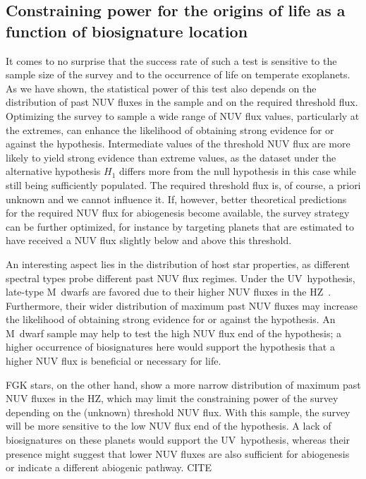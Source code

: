 \documentclass[twocolumn,twocolappendix,linenumbers]{aastex631}
\begin{document}
\subsection{Constraining power for the origins of life as a function of biosignature location} %
It comes to no surprise that the success rate of such a test is sensitive to the sample size of the survey and to the occurrence of life on temperate exoplanets.
As we have shown, the statistical power of this test also depends on the distribution of past \gls{NUV} fluxes in the sample and on the required threshold flux.
Optimizing the survey to sample a wide range of NUV flux values, particularly at the extremes, can enhance the likelihood of obtaining strong evidence for or against the hypothesis.
Intermediate values of the threshold \gls{NUV} flux are more likely to yield strong evidence than extreme values, as the dataset under the alternative hypothesis $H_1$ differs more from the null hypothesis in this case while still being sufficiently populated.
The required threshold flux is, of course, a priori unknown and we cannot influence it.
If, however, better theoretical predictions for the required \gls{NUV} flux for abiogenesis become available, the survey strategy can be further optimized, for instance by targeting planets that are estimated to have received a \gls{NUV} flux slightly below and above this threshold.

An interesting aspect lies in the distribution of host star properties, as different spectral types probe different past \gls{NUV} flux regimes.
Under the UV~hypothesis, late-type M~dwarfs are favored due to their higher \gls{NUV} fluxes in the \gls{HZ}~\citep{Richey-Yowell2023}.
Furthermore, their wider distribution of maximum past \gls{NUV} fluxes may increase the likelihood of obtaining strong evidence for or against the hypothesis.
An M~dwarf sample may help to test the high \gls{NUV} flux end of the hypothesis; a higher occurrence of biosignatures here would support the hypothesis that a higher NUV flux is beneficial or necessary for life.

FGK stars, on the other hand, show a more narrow distribution of maximum past \gls{NUV} fluxes in the \gls{HZ}, which may limit the constraining power of the survey depending on the (unknown) threshold \gls{NUV} flux.
With this sample, the survey will be more sensitive to the low \gls{NUV} flux end of the hypothesis.
A lack of biosignatures on these planets would support the UV~hypothesis, whereas their presence might suggest that lower NUV fluxes are also sufficient for abiogenesis or indicate a different abiogenic pathway. CITE
\end{document}
